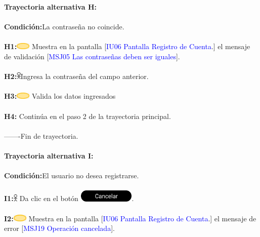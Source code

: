                     \textbf{Trayectoria alternativa H:}\\\\
                        \textbf{Condición:}La contraseña no coincide.\\\\
                        \textbf{H1:}\includegraphics[width=0.0500\textwidth]{Figuras/sistema.png} Muestra en la pantalla [\textcolor{blue}{IU06 Pantalla Registro de Cuenta}.] el mensaje de validación [\textcolor{blue}{MSJ05 Las contraseñas deben ser iguales}].  \\\\  
                        \textbf{H2:}\includegraphics[width=0.0150\textwidth]{Figuras/persona.png}Ingresa la contraseña del campo anterior.\\\\
                        \textbf{H3:}\includegraphics[width=0.0500\textwidth]{Figuras/sistema.png} Valida los datos ingresados\\\\
                        \textbf{H4:} Continúa en el paso 2 de la trayectoria principal.\\\\
       
        -------Fin de  trayectoria. \\\\

                    \textbf{Trayectoria alternativa I:}\\\\
                        \textbf{Condición:}El usuario no desea registrarse.\\\\
                        \textbf{I1:}\includegraphics[width=0.0150\textwidth]{Figuras/persona.png} Da clic en el botón \includegraphics[width=0.2\textwidth]{Group 94.png}.\\\\
                        \textbf{I2:}\includegraphics[width=0.0500\textwidth]{Figuras/sistema.png} Muestra en la pantalla [\textcolor{blue}{IU06 Pantalla Registro de Cuenta}.] el mensaje de error [\textcolor{blue}{MSJ19 Operación cancelada}].  \\\\
                        
